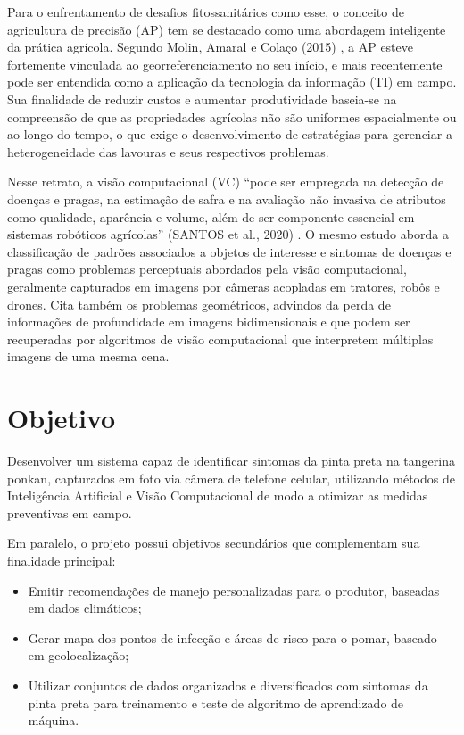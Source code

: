 \documentclass[11pt,a4paper]{article}
\begin{document}
Para o enfrentamento de desafios fitossanitários como esse, o conceito de agricultura de precisão (AP) tem se destacado como uma abordagem inteligente da prática agrícola. Segundo Molin, Amaral e Colaço (2015) \cite{Molin2015}, a AP esteve fortemente vinculada ao georreferenciamento no seu início, e mais recentemente pode ser entendida como a aplicação da tecnologia da informação (TI) em campo. Sua finalidade de reduzir custos e aumentar produtividade baseia-se na compreensão de que as propriedades agrícolas não são uniformes espacialmente ou ao longo do tempo, o que exige o desenvolvimento de estratégias para gerenciar a heterogeneidade das lavouras e seus respectivos problemas.

Nesse retrato, a visão computacional (VC) “pode ser empregada na detecção de doenças e pragas, na estimação de safra e na avaliação não invasiva de atributos como qualidade, aparência e volume, além de ser componente essencial em sistemas robóticos agrícolas” (SANTOS et al., 2020) \cite{santos2020visao}. O mesmo estudo aborda a classificação de padrões associados a objetos de interesse e sintomas de doenças e pragas como problemas  perceptuais abordados pela visão computacional, geralmente capturados em imagens por câmeras acopladas em tratores, robôs e drones. Cita também os problemas geométricos, advindos da perda de informações de profundidade em imagens bidimensionais e que podem ser recuperadas por algoritmos de visão computacional que interpretem múltiplas imagens de uma mesma cena.

\section{Objetivo}

Desenvolver um sistema capaz de identificar sintomas da pinta preta na tangerina ponkan, capturados em foto via câmera de telefone celular, utilizando métodos de Inteligência Artificial e Visão Computacional de modo a otimizar as medidas preventivas em campo. 

Em paralelo, o projeto possui objetivos secundários que complementam sua finalidade principal:

\begin{itemize}
    \item Emitir recomendações de manejo personalizadas para o produtor, baseadas em dados climáticos;
    \item Gerar mapa dos pontos de infecção e áreas de risco para o pomar, baseado em geolocalização; 
    \item Utilizar conjuntos de dados organizados e diversificados com sintomas da pinta preta para treinamento e teste de algoritmo de aprendizado de máquina.
\end{itemize}
\end{document}
